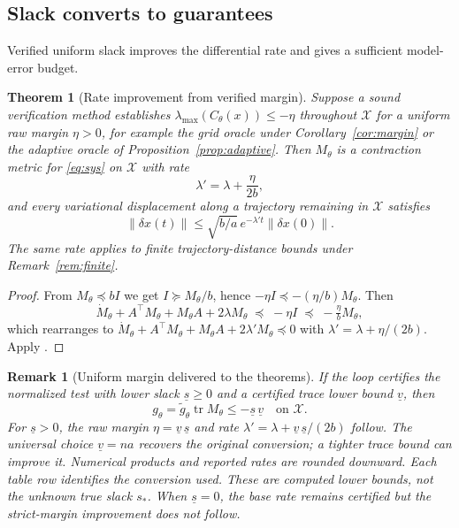 \documentclass[12pt,onecolumn,journal]{IEEEtran}
\newtheorem{theorem}{Theorem}
\newtheorem{remark}{Remark}
\newcommand{\X}{\mathcal{X}}
\newcommand{\lmax}{\lambda_{\max}}
\providecommand{\tr}{}
\renewcommand{\tr}{\operatorname{tr}}
\begin{document}
\subsection{Slack converts to guarantees}

Verified uniform slack improves the differential rate and gives a sufficient model-error budget.

\begin{theorem}[Rate improvement from verified margin]
\label{thm:rate}
Suppose a sound verification method establishes $\lmax(C_\theta(x))\le-\eta$ throughout $\X$ for a uniform raw margin $\eta>0$, for example the grid oracle under Corollary~\ref{cor:margin} or the adaptive oracle of Proposition~\ref{prop:adaptive}. Then $M_\theta$ is a contraction metric for \eqref{eq:sys} on $\X$ with rate
\[
\lambda' = \lambda + \frac{\eta}{2b},
\]
and every variational displacement along a trajectory remaining in $\X$ satisfies
\[
\|\delta x(t)\| \le \sqrt{b/a}\, e^{-\lambda' t} \|\delta x(0)\|.
\]
The same rate applies to finite trajectory-distance bounds under Remark~\ref{rem:finite}.
\end{theorem}

\begin{proof}
From $M_\theta \preceq bI$ we get $I \succeq M_\theta / b$, hence $-\eta I \preceq -(\eta/b) M_\theta$. Then
\[
\dot M_\theta + A^\top M_\theta + M_\theta A + 2\lambda M_\theta \;\preceq\; -\eta I \;\preceq\; -\tfrac{\eta}{b} M_\theta,
\]
which rearranges to $\dot M_\theta + A^\top M_\theta + M_\theta A + 2\lambda' M_\theta \preceq 0$ with $\lambda' = \lambda + \eta/(2b)$. Apply \cite{lohmiller1998}.
\end{proof}

\begin{remark}[Uniform margin delivered to the theorems]
\label{rem:eta}
If the loop certifies the normalized test with lower slack $\underline s\ge0$ and a certified trace lower bound $\underline v$, then
\[
g_\theta=\tilde g_\theta\tr M_\theta\le-\underline s\,\underline v\quad\text{on }\X.
\]
For $\underline s>0$, the raw margin $\eta=\underline v\,\underline s$ and rate $\lambda'=\lambda+\underline v\,\underline s/(2b)$ follow. The universal choice $\underline v=na$ recovers the original conversion; a tighter trace bound can improve it. Numerical products and reported rates are rounded downward. Each table row identifies the conversion used. These are computed lower bounds, not the unknown true slack $s_*$. When $\underline s=0$, the base rate remains certified but the strict-margin improvement does not follow.
\end{remark}
\end{document}
